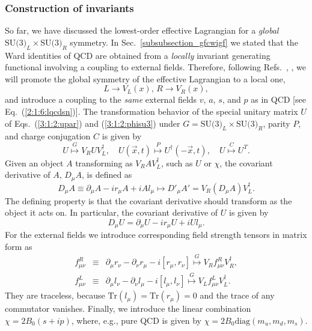 \documentclass[twoside,12pt]{article}
\begin{document}
\subsubsection{Construction of invariants}
\label{subsubsection_ci}
   So far, we have discussed the lowest-order effective Lagrangian for a {\em global}
$\mbox{SU(3)}_L\times\mbox{SU(3)}_R$ symmetry.
   In Sec.\ \ref{subsubsection_gfcwigf} we stated that the Ward identities of QCD
are obtained from a {\em locally} invariant generating functional involving a coupling to
external fields.
   Therefore, following Refs.\ \cite{Gasser:1983yg}, \cite{Gasser:1984gg}, we
will promote the global symmetry of the effective Lagrangian to a local one,
\begin{displaymath}
L\rightarrow V_L(x),\, R\rightarrow V_R(x),
\end{displaymath}
and introduce a coupling to the {\em same} external fields $v$, $a$, $s$, and $p$ as in
QCD [see Eq.\ (\ref{2:1:6:lqcdsn})].
   The transformation behavior of the special unitary matrix $U$ of Eqs.~(\ref{3:1:2:upar}) and
(\ref{3:1:2:phisu3}) under
$G=\mbox{SU(3)}_L\times\mbox{SU(3)}_R$, parity $P$, and charge
conjugation $C$ is given by
\begin{displaymath}
U\stackrel{G}{\mapsto}V_R U V_L^{\dagger},\quad
U(\vec{x},t)\stackrel{P}{\mapsto}U^\dagger(-\vec{x},t),\quad
U\stackrel{C}{\mapsto}U^T.
\end{displaymath}
  Given an object $A$ transforming as $V_R A V_L^\dagger$, such as $U$ or $\chi$,
the covariant derivative of $A$, $D_\mu A$, is defined as
\begin{equation}
\label{3:2:3:kaa}
D_\mu A\equiv\partial_\mu A -i r_\mu A+iA l_\mu
\mapsto D'_\mu A'
= V_R(D_\mu A) V_L^\dagger.
\end{equation}
The defining property is that the covariant derivative should transform as the object
it acts on. In particular, the covariant derivative of $U$ is given by
\begin{equation}
\label{3:2:3:kdU}
 D_{\mu} U =\partial_{\mu}U-ir_{\mu}U+iU l_{\mu}.
\end{equation}
   For the external fields we introduce corresponding field strength tensors in matrix form
as
\begin{eqnarray}
\label{3:2:3:fr}
f_{\mu\nu}^R&\equiv&\partial_\mu r_\nu-\partial_\nu r_\mu-i{[r_\mu,r_\nu]}
\stackrel{G}{\mapsto}V_R f_{\mu\nu}^R V_R^\dagger,\\
\label{3:2:3:fl} f_{\mu\nu}^L&\equiv&\partial_\mu l_\nu-\partial_\nu
l_\mu-i{[l_\mu,l_\nu]}\stackrel{G}{\mapsto}V_L f_{\mu\nu}^L
V_L^\dagger.
\end{eqnarray}
   They are traceless, because $\mbox{Tr}(l_\mu)=\mbox{Tr}(r_\mu)=0$ and the trace of any
commutator vanishes.
   Finally, we introduce the linear combination $\chi=2B_0(s+ip)$, where,
e.g., pure QCD is given by $\chi=2B_0\mbox{diag}(m_u,m_d,m_s)$.
\end{document}
